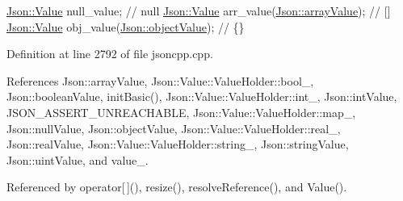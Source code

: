 \begin{DoxyCode}
\hyperlink{class_json_1_1_value}{Json::Value} null\_value; \textcolor{comment}{// null}
\hyperlink{class_json_1_1_value}{Json::Value} arr\_value(\hyperlink{namespace_json_a7d654b75c16a57007925868e38212b4eadc8f264f36b55b063c78126b335415f4}{Json::arrayValue}); \textcolor{comment}{// []}
\hyperlink{class_json_1_1_value}{Json::Value} obj\_value(\hyperlink{namespace_json_a7d654b75c16a57007925868e38212b4eae8386dcfc36d1ae897745f7b4f77a1f6}{Json::objectValue}); \textcolor{comment}{// \{\}}
\end{DoxyCode}
 

Definition at line 2792 of file jsoncpp.\+cpp.



References Json\+::array\+Value, Json\+::\+Value\+::\+Value\+Holder\+::bool\+\_\+, Json\+::boolean\+Value, init\+Basic(), Json\+::\+Value\+::\+Value\+Holder\+::int\+\_\+, Json\+::int\+Value, J\+S\+O\+N\+\_\+\+A\+S\+S\+E\+R\+T\+\_\+\+U\+N\+R\+E\+A\+C\+H\+A\+B\+LE, Json\+::\+Value\+::\+Value\+Holder\+::map\+\_\+, Json\+::null\+Value, Json\+::object\+Value, Json\+::\+Value\+::\+Value\+Holder\+::real\+\_\+, Json\+::real\+Value, Json\+::\+Value\+::\+Value\+Holder\+::string\+\_\+, Json\+::string\+Value, Json\+::uint\+Value, and value\+\_\+.



Referenced by operator\mbox{[}$\,$\mbox{]}(), resize(), resolve\+Reference(), and Value().


